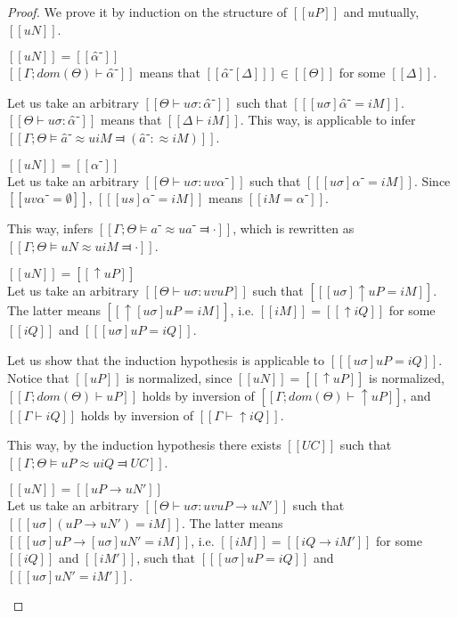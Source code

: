 \lemmaUnificationCompleteness*
\begin{proof}
    We prove it by induction on the structure of $[[uP]]$ and mutually, $[[uN]]$.
    \begin{caseof}
        \item $[[uN]] = [[α̂⁻]]$\\
            $[[Γ ; dom(Θ) ⊢  α̂⁻]]$ means that $[[ α̂⁻[Δ] ]] \in [[Θ]]$ for some $[[Δ]]$.

            Let us take an arbitrary $[[Θ ⊢ uσ : {α̂⁻} ]]$ such that $[[ [uσ]α̂⁻ = iM ]]$.
            $[[Θ ⊢ uσ : {α̂⁻}]]$ means that $[[Δ ⊢ iM]]$.
            This way,  is applicable to infer 
            $[[Γ ; Θ ⊨ â⁻ ≈u iM ⫤ (â⁻ :≈ iM)]]$.
            
        \item $[[uN]] = [[α⁻]]$\\
            Let us take an arbitrary $[[Θ ⊢ uσ : uv α⁻]]$ such that $[[ [uσ]α⁻ = iM ]]$.
            Since $[[uv α⁻ = ∅]]$, $[[ [us]α⁻ = iM ]]$ means $[[iM = α⁻]]$.

            This way,  infers 
            $[[Γ; Θ ⊨ a⁻ ≈u a⁻ ⫤ ·]]$, which is rewritten as $[[Γ; Θ ⊨ uN ≈u iM ⫤ ·]]$.

        \item $[[uN]] = [[↑uP]]$\\
            Let us take an arbitrary $[[Θ ⊢ uσ : uv uP]]$ such that $[[ [uσ]↑uP = iM ]]$.
            The latter means $[[ ↑[uσ]uP = iM ]]$, i.e.
            $[[iM]] = [[↑iQ]]$ for some $[[iQ]]$ and $[[ [uσ]uP = iQ ]]$.

            Let us show that the induction hypothesis is applicable to $[[ [uσ]uP = iQ ]]$.
            Notice that $[[uP]]$ is normalized, since $[[uN]] = [[↑uP]]$ is normalized,
            $[[Γ ; dom(Θ) ⊢  uP]]$ holds by inversion of $[[Γ ; dom(Θ) ⊢  ↑uP]]$, 
            and $[[Γ ⊢ iQ]]$ holds by inversion of $[[Γ ⊢ ↑iQ]]$.

            This way, by the induction hypothesis there exists $[[UC]]$ such that
            $[[Γ ; Θ ⊨ uP ≈u iQ ⫤ UC]]$.
            
        \item $[[uN]] = [[uP → uN']]$\\
            Let us take an arbitrary $[[Θ ⊢ uσ : uv uP → uN']]$ such that $[[ [uσ](uP → uN') = iM ]]$.
            The latter means $[[ [uσ]uP → [uσ]uN' = iM ]]$, i.e.
            $[[iM]] = [[iQ → iM']]$ for some $[[iQ]]$ and $[[iM']]$, 
            such that $[[ [uσ]uP = iQ ]]$ and $[[ [uσ]uN' = iM' ]]$.


\end{caseof}
\end{proof}
